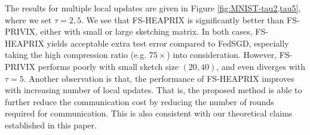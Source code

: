 The results for multiple local updates are given in Figure \ref{fig:MNIST-tau2,tau5}, where we set $\tau=2,5$. We see that FS-HEAPRIX is significantly better than FS-PRIVIX, either with small or large sketching matrix. In both cases, FS-HEAPRIX yields acceptable extra test error compared to FedSGD, especially taking the high compression ratio (e.g. $75\times$) into consideration. However, FS-PRIVIX performs poorly with small sketch size $(20,40)$, and even diverges with $\tau=5$. Another observation is that, the performance of FS-HEAPRIX improves with increasing number of local updates. That is, the proposed method is able to further reduce the communication cost by reducing the number of rounds required for communication. This is also consistent with our theoretical claims established in this paper.